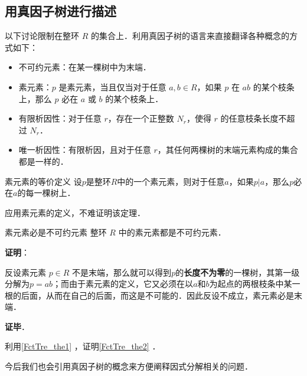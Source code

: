 

\subsection{用真因子树进行描述}

以下讨论限制在整环 $R$ 的集合上．利用真因子树的语言来直接翻译各种概念的方式如下：

\begin{definition}{}\label{FctTre_def1}
\begin{itemize}
\item 不可约元素：在某一棵树中为末端．
\item 素元素：$p$ 是素元素，当且仅当对于任意 $a, b\in R$，如果 $p$ 在 $ab$ 的某个枝条上，那么 $p$ 必在 $a$ 或 $b$ 的某个枝条上．
\item 有限析因性：对于任意 $r$，存在一个正整数 $N_r$，使得 $r$ 的任意枝条长度不超过 $N_r$．
\item 唯一析因性：有限析因，且对于任意 $r$，其任何两棵树的末端元素构成的集合都是一样的．
\end{itemize}
\end{definition}

\begin{theorem}{素元素的等价定义}\label{FctTre_the1}
设$p$是整环$R$中的一个素元素，则对于任意$a$，如果$p|a$，那么$p$必在$a$的每一棵树上．
\end{theorem}

应用素元素的定义，不难证明该定理．


\begin{theorem}{素元素必是不可约元素}\label{FctTre_the2}
整环 $R$ 中的素元素都是不可约元素．
\end{theorem}

\textbf{证明}：

反设素元素 $p\in R$ 不是末端，那么就可以得到$p$的\textbf{长度不为零}的一棵树，其第一级分解为$p=ab$；而由于素元素的定义，它又必须在以$a$和$b$为起点的两根枝条中某一根的后面，从而在自己的后面，而这是不可能的．因此反设不成立，素元素必是末端．

\textbf{证毕}．

\begin{exercise}{}
利用\autoref{FctTre_the1} ，证明\autoref{FctTre_the2} ．
\end{exercise}

今后我们也会引用真因子树的概念来方便阐释因式分解相关的问题．


